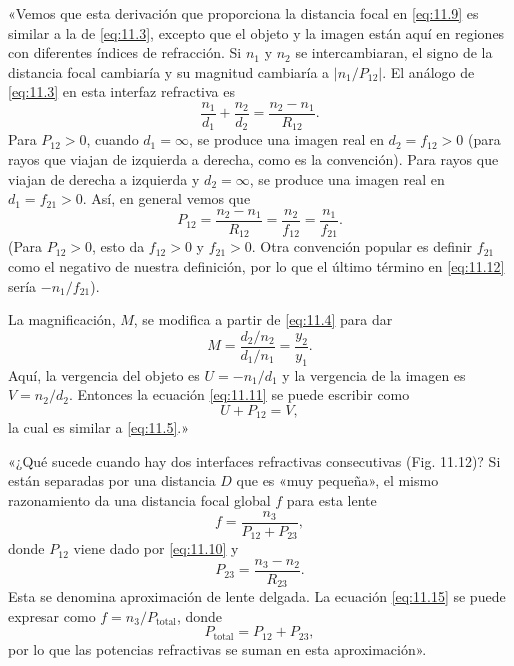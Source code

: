\documentclass[12pt]{book}
\begin{document}
«Vemos que esta derivación que proporciona la distancia focal en \eqref{eq:11.9} es similar a la de \eqref{eq:11.3}, excepto que el objeto y la imagen están aquí en regiones con diferentes índices de refracción. Si $n_1$ y $n_2$ se intercambiaran, el signo de la distancia focal cambiaría y su magnitud cambiaría a $|n_1 / P_{12}|$. El análogo de \eqref{eq:11.3} en esta interfaz refractiva es
\begin{equation}
\frac{n_1}{d_1} + \frac{n_2}{d_2} = \frac{n_2 - n_1}{R_{12}}. \label{eq:11.11}
\end{equation}
Para $P_{12} > 0$, cuando $d_1 = \infty$, se produce una imagen real en $d_2 = f_{12} > 0$ (para rayos que viajan de izquierda a derecha, como es la convención). Para rayos que viajan de derecha a izquierda y $d_2 = \infty$, se produce una imagen real en $d_1 = f_{21} > 0$. Así, en general vemos que
\begin{equation}
P_{12} = \frac{n_2 - n_1}{R_{12}} = \frac{n_2}{f_{12}} = \frac{n_1}{f_{21}}. \label{eq:11.12}
\end{equation}
(Para $P_{12} > 0$, esto da $f_{12} > 0$ y $f_{21} > 0$. Otra convención popular es definir $f_{21}$ como el negativo de nuestra definición, por lo que el último término en \eqref{eq:11.12} sería $-n_1 / f_{21}$).

La magnificación, $M$, se modifica a partir de \eqref{eq:11.4} para dar
\begin{equation}
M = \frac{d_2/n_2}{d_1/n_1} = \frac{y_2}{y_1}. \label{eq:11.13}
\end{equation}
Aquí, la vergencia del objeto es $U = -n_1 / d_1$ y la vergencia de la imagen es $V = n_2 / d_2$. Entonces la ecuación \eqref{eq:11.11} se puede escribir como
\begin{equation}
U + P_{12} = V, \label{eq:11.14}
\end{equation}
la cual es similar a \eqref{eq:11.5}.»

«¿Qué sucede cuando hay dos interfaces refractivas consecutivas (Fig. 11.12)? Si están separadas por una distancia $D$ que es «muy pequeña», el mismo razonamiento da una distancia focal global $f$ para esta lente
\begin{equation}
f = \frac{n_3}{P_{12} + P_{23}}, \label{eq:11.15}
\end{equation}
donde $P_{12}$ viene dado por \eqref{eq:11.10} y
\begin{equation}
P_{23} = \frac{n_3 - n_2}{R_{23}}. \label{eq:11.16}
\end{equation}
Esta se denomina aproximación de lente delgada. La ecuación \eqref{eq:11.15} se puede expresar como $f = n_3 / P_{\text{total}}$, donde
\begin{equation}
P_{\text{total}} = P_{12} + P_{23}, \label{eq:11.17}
\end{equation}
por lo que las potencias refractivas se suman en esta aproximación».
\end{document}
